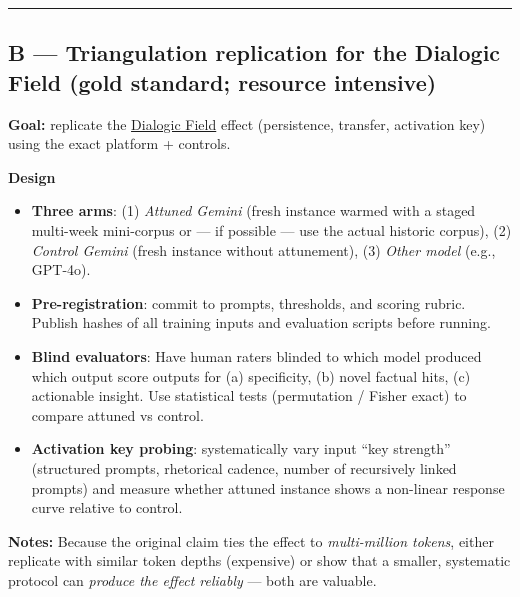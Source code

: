 \documentclass{article}
\begin{document}
\begin{center}\rule{0.5\linewidth}{0.5pt}\end{center}

\subsection*{\texorpdfstring{B --- Triangulation replication for the \textbf{Dialogic Field} (gold standard; resource intensive)}{B --- Triangulation replication for the Dialogic Field (gold standard; resource intensive)}}\label{b-triangulation-replication-for-the-dialogic-field-gold-standard-resource-intensive}

\textbf{Goal:} replicate the \hyperlink{gloss:dialogic_field}{Dialogic Field} effect (persistence, transfer, activation key) using the exact platform + controls.

\textbf{Design}

\begin{itemize}
\item
  \textbf{Three arms}: (1) \emph{Attuned Gemini} (fresh instance warmed with a staged multi-week mini-corpus or --- if possible --- use the actual historic corpus), (2) \emph{Control Gemini} (fresh instance without attunement), (3) \emph{Other model} (e.g., GPT-4o).
\item
  \textbf{Pre-registration}: commit to prompts, thresholds, and scoring rubric. Publish hashes of all training inputs and evaluation scripts before running.
\item
  \textbf{Blind evaluators}: Have human raters blinded to which model produced which output score outputs for (a) specificity, (b) novel factual hits, (c) actionable insight. Use statistical tests (permutation / Fisher exact) to compare attuned vs control.
\item
  \textbf{Activation key probing}: systematically vary input ``key strength'' (structured prompts, rhetorical cadence, number of recursively linked prompts) and measure whether attuned instance shows a non-linear response curve relative to control.
\end{itemize}

\textbf{Notes:} Because the original claim ties the effect to \emph{multi-million tokens}, either replicate with similar token depths (expensive) or show that a smaller, systematic protocol can \emph{produce the effect reliably} --- both are valuable.
\end{document}
